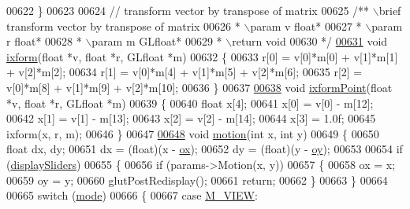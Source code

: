 \begin{DoxyCode}
{{{{{{{00622 \}
00623 
00624 \textcolor{comment}{// transform vector by transpose of matrix}
00625 \textcolor{comment}{/** \(\backslash\)brief transform vector by transpose of matrix}
00626 \textcolor{comment}{ * \(\backslash\)param v float*}
00627 \textcolor{comment}{ * \(\backslash\)param r float*}
00628 \textcolor{comment}{ * \(\backslash\)param m GLfloat*}
00629 \textcolor{comment}{ * \(\backslash\)return void}
00630 \textcolor{comment}{ */}
\hypertarget{particles_8cpp_source_l00631}{}\hyperlink{particles_8cpp_aa22b13a9b9cf40b19f9c1c09603862c8}{00631} \textcolor{keywordtype}{void} \hyperlink{particles_8cpp_aa22b13a9b9cf40b19f9c1c09603862c8}{ixform}(\textcolor{keywordtype}{float} *v, \textcolor{keywordtype}{float} *r, GLfloat *m)
00632 \{
00633     r[0] = v[0]*m[0] + v[1]*m[1] + v[2]*m[2];
00634     r[1] = v[0]*m[4] + v[1]*m[5] + v[2]*m[6];
00635     r[2] = v[0]*m[8] + v[1]*m[9] + v[2]*m[10];
00636 \}
00637 
\hypertarget{particles_8cpp_source_l00638}{}\hyperlink{particles_8cpp_a9b3bc33348ec5b4dbb049f91362459b8}{00638} \textcolor{keywordtype}{void} \hyperlink{particles_8cpp_a9b3bc33348ec5b4dbb049f91362459b8}{ixformPoint}(\textcolor{keywordtype}{float} *v, \textcolor{keywordtype}{float} *r, GLfloat *m)
00639 \{
00640     \textcolor{keywordtype}{float} x[4];
00641     x[0] = v[0] - m[12];
00642     x[1] = v[1] - m[13];
00643     x[2] = v[2] - m[14];
00644     x[3] = 1.0f;
00645     ixform(x, r, m);
00646 \}
00647 
\hypertarget{particles_8cpp_source_l00648}{}\hyperlink{particles_8cpp_a45a7d7c86c97ca6a2d4d32ce2d263f67}{00648} \textcolor{keywordtype}{void} \hyperlink{particles_8cpp_a45a7d7c86c97ca6a2d4d32ce2d263f67}{motion}(\textcolor{keywordtype}{int} x, \textcolor{keywordtype}{int} y)
00649 \{
00650     \textcolor{keywordtype}{float} dx, dy;
00651     dx = (\textcolor{keywordtype}{float})(x - \hyperlink{particles_8cpp_afef635ed3c73fc60d8faf6dd610c4298}{ox});
00652     dy = (\textcolor{keywordtype}{float})(y - \hyperlink{particles_8cpp_a791e26888be6777cd5c5d0c736a06821}{oy});
00653 
00654     \textcolor{keywordflow}{if} (\hyperlink{particles_8cpp_ac345a677e529047cf89d33fc26f10fe7}{displaySliders})
00655     \{
00656         \textcolor{keywordflow}{if} (params->Motion(x, y))
00657         \{
00658             ox = x;
00659             oy = y;
00660             glutPostRedisplay();
00661             \textcolor{keywordflow}{return};
00662         \}
00663     \}
00664 
00665     \textcolor{keywordflow}{switch} (\hyperlink{particles_8cpp_a1ea5d0cb93f22f7d0fdf804bd68c3326}{mode})
00666     \{
00667         \textcolor{keywordflow}{case} \hyperlink{particles_8cpp_a06fc87d81c62e9abb8790b6e5713c55ba04727eefdf62663010249dd6d065d37a}{M\_VIEW}:
}}}}}}}
\end{DoxyCode}
